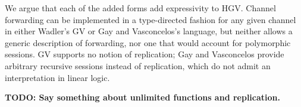 \documentclass{easychair}
\newcommand{\key}{\mathsf}
\newcommand{\gvInput}[2]{\mathord{?}{#1}.{#2}}
\newcommand{\gvEndOutput}{\key{end}_!}
\newcommand{\gvEndInput}{\key{end}_?}
\newcommand{\gvj}[3]{{#1} \vdash {#2} : {#3}}
\newcommand{\gvTimes}[2]{{#1} \otimes {#2}}
\newcommand{\gvLink}[2]{\key{link}~{#1}~{#2}}
\newcommand{\gvReceive}[1]{\key{receive}~{#1}}
\newcommand{\gvTerminate}[1]{\key{terminate}~{#1}}
\newcommand{\gvSendType}[2]{\key{sendType}~{#1}~{#2}}
\newcommand{\gvReceiveType}[1]{\key{receiveType}~{#1}}
\newcommand{\gvServe}[2]{\key{serve}~{#1}.{#2}}
\newcommand{\gvRequest}[1]{\key{request}~{#1}}
\newcommand{\hgv}{HGV\xspace}
\newcommand{\todo}[1]{\textbf{\color{red}TODO: #1}}
\begin{document}
We argue that each of the added forms add expressivity to \hgv.  Channel forwarding can be
implemented in a type-directed fashion for any given channel in either Wadler's GV or Gay and
Vasconcelos's language, but neither allows a generic description of forwarding, nor one that would
account for polymorphic sessions.  GV supports no notion of replication; Gay and Vasconcelos provide
arbitrary recursive sessions instead of replication, which do not admit an interpretation in linear
logic.

\todo{Say something about unlimited functions and replication.}

\end{document}
